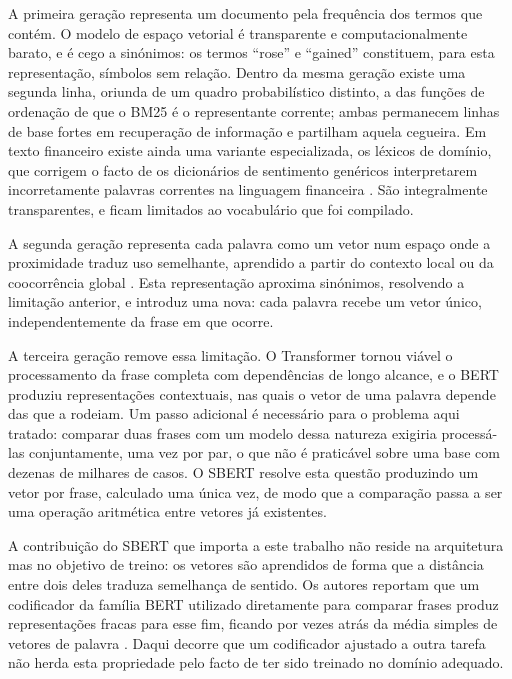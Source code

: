 A primeira geração representa um documento pela frequência dos termos que contém. O modelo de
espaço vetorial \autocite{salton1975vsm} é transparente e computacionalmente barato, e é cego a
sinónimos: os termos ``rose'' e ``gained'' constituem, para esta representação, símbolos sem
relação. Dentro da mesma geração existe uma segunda linha, oriunda de um quadro probabilístico
distinto, a das funções de ordenação de que o BM25 \autocite{robertson2009bm25} é o representante
corrente; ambas permanecem linhas de base fortes em recuperação de informação e partilham aquela
cegueira. Em texto financeiro existe ainda uma variante especializada, os léxicos de domínio, que
corrigem o facto de os dicionários de sentimento genéricos interpretarem incorretamente palavras
correntes na linguagem financeira \autocite{loughran2011liability}. São integralmente
transparentes, e ficam limitados ao vocabulário que foi compilado.

A segunda geração representa cada palavra como um vetor num espaço onde a proximidade traduz uso
semelhante, aprendido a partir do contexto local \autocite{mikolov2013word2vec} ou da coocorrência
global \autocite{pennington2014glove}. Esta representação aproxima sinónimos, resolvendo a limitação
anterior, e introduz uma nova: cada palavra recebe um vetor único, independentemente da frase em
que ocorre.

A terceira geração remove essa limitação. O Transformer \autocite{vaswani2017attention} tornou
viável o processamento da frase completa com dependências de longo alcance, e o \gls{BERT}
\autocite{devlin2019bert} produziu representações contextuais, nas quais o vetor de uma palavra
depende das que a rodeiam. Um passo adicional é necessário para o problema aqui tratado: comparar
duas frases com um modelo dessa natureza exigiria processá-las conjuntamente, uma vez por par, o
que não é praticável sobre uma base com dezenas de milhares de casos. O \gls{SBERT}
\autocite{reimers2019sbert} resolve esta questão produzindo um vetor por frase, calculado uma única
vez, de modo que a comparação passa a ser uma operação aritmética entre vetores já existentes.

A contribuição do \gls{SBERT} que importa a este trabalho não reside na arquitetura mas no objetivo
de treino: os vetores são aprendidos de forma que a distância entre dois deles traduza semelhança
de sentido. Os autores reportam que um codificador da família \gls{BERT} utilizado diretamente para
comparar frases produz representações fracas para esse fim, ficando por vezes atrás da média
simples de vetores de palavra \autocite{reimers2019sbert}. Daqui decorre que um codificador ajustado
a outra tarefa não herda esta propriedade pelo facto de ter sido treinado no domínio adequado.

